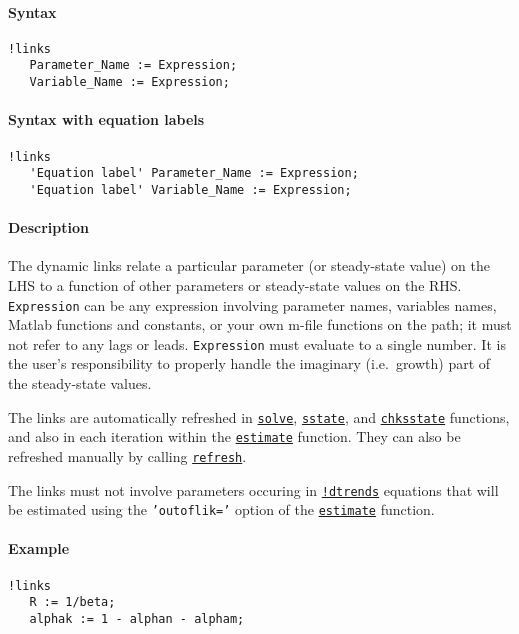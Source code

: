 


	\paragraph{Syntax}

\begin{verbatim}
!links
   Parameter_Name := Expression;
   Variable_Name := Expression;
\end{verbatim}

\paragraph{Syntax with equation
labels}

\begin{verbatim}
!links
   'Equation label' Parameter_Name := Expression;
   'Equation label' Variable_Name := Expression;
\end{verbatim}

\paragraph{Description}

The dynamic links relate a particular parameter (or steady-state value)
on the LHS to a function of other parameters or steady-state values on
the RHS. \texttt{Expression} can be any expression involving parameter
names, variables names, Matlab functions and constants, or your own
m-file functions on the path; it must not refer to any lags or leads.
\texttt{Expression} must evaluate to a single number. It is the user's
responsibility to properly handle the imaginary (i.e.~growth) part of
the steady-state values.

The links are automatically refreshed in
\href{model/solve}{\texttt{solve}},
\href{model/sstate}{\texttt{sstate}}, and
\href{model/chksstate}{\texttt{chksstate}} functions, and also in each
iteration within the \href{model/estimate}{\texttt{estimate}} function.
They can also be refreshed manually by calling
\href{model/refresh}{\texttt{refresh}}.

The links must not involve parameters occuring in
\href{modellang/dtrends}{\texttt{!dtrends}} equations that will be
estimated using the \texttt{'outoflik='} option of the
\href{model/estimate}{\texttt{estimate}} function.

\paragraph{Example}

\begin{verbatim}
!links
   R := 1/beta;
   alphak := 1 - alphan - alpham;
\end{verbatim}


